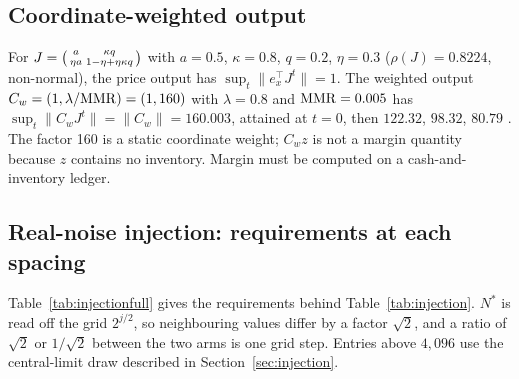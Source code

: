 \subsection{Coordinate-weighted output}\label{app:coordw}
For $J=\begin{psmallmatrix}a&\kappa q\\ \eta a&1-\eta+\eta\kappa q\end{psmallmatrix}$ with $a=0.5$, $\kappa=0.8$, $q=0.2$, $\eta=0.3$ ($\rho(J)=0.8224$, non-normal), the price output has $\sup_t\|e_x^\top J^t\|=1$. The weighted output $C_w=(1,\lambda/{\rm MMR})=(1,160)$ with $\lambda=0.8$ and ${\rm MMR}=0.005$ has $\sup_t\|C_wJ^t\|=\|C_w\|=160.003$, attained at $t=0$, then $122.32$, $98.32$, $80.79$ . The factor 160 is a static coordinate weight; $C_wz$ is not a margin quantity because $z$ contains no inventory. Margin must be computed on a cash-and-inventory ledger.

\subsection{Real-noise injection: requirements at each spacing}\label{app:injection}

Table~\ref{tab:injectionfull} gives the requirements behind Table~\ref{tab:injection}. $N^*$ is read off the grid $2^{j/2}$, so neighbouring values differ by a factor $\sqrt2$, and a ratio of $\sqrt2$ or $1/\sqrt2$ between the two arms is one grid step. Entries above $4{,}096$ use the central-limit draw described in Section~\ref{sec:injection}.

